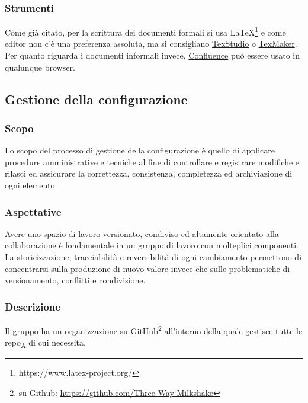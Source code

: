     \subsubsection{Strumenti}
    Come già citato, per la scrittura dei documenti formali si usa \LaTeX\footnote{https://www.latex-project.org/} e come editor non c'è una preferenza assoluta, ma si consigliano \href{http://www.texstudio.org/}{TexStudio} o \href{https://www.xm1math.net/texmaker/}{TexMaker}. Per quanto riguarda i documenti informali invece, \href{https://www.atlassian.com/software/confluence}{Confluence} può essere usato in qualunque browser.

\subsection{Gestione della configurazione}
    \subsubsection{Scopo}
        Lo scopo del processo di gestione della configurazione è quello di applicare procedure amministrative e tecniche al fine di controllare e registrare modifiche e rilasci ed assicurare la correttezza, consistenza, completezza ed archiviazione di ogni elemento.
    \subsubsection{Aspettative}
        Avere uno spazio di lavoro versionato, condiviso ed altamente orientato alla collaborazione è fondamentale in un gruppo di lavoro con molteplici componenti. La storicizzazione, tracciabilità e reversibilità di ogni cambiamento permettono di concentrarsi sulla produzione di nuovo valore invece che sulle problematiche di versionamento, conflitti e condivisione.
    \subsubsection{Descrizione}
        Il gruppo \group ha un organizzazione su GitHub\footnote{\group su Github: \url{https://github.com/Three-Way-Milkshake}} all'interno della quale gestisce tutte le repo\textsubscript{A} di cui necessita.
